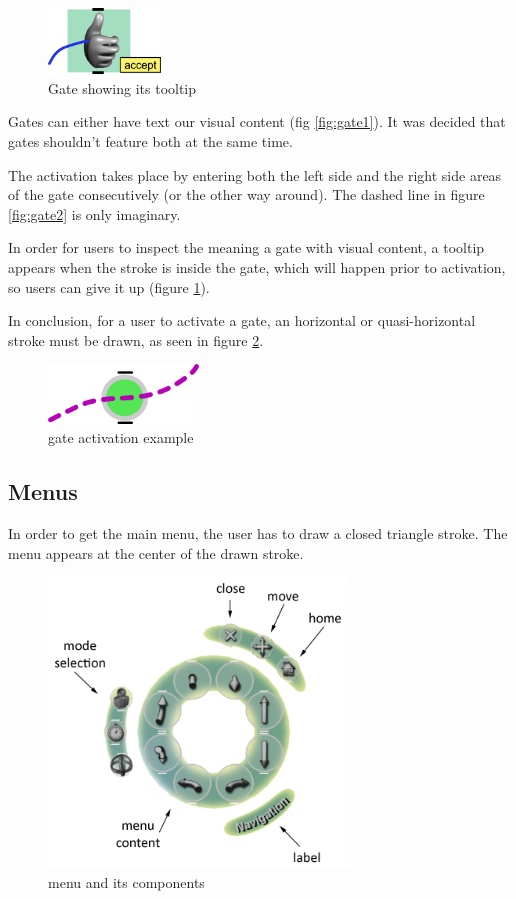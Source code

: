 \begin{figure}[!ht]
		\vspace{-0.3cm}
		\centering
		\includegraphics[width=3cm]{gfx/gate3e.png}
		\vspace{-0.5cm}
		\caption{Gate showing its tooltip}
		\label{fig:gate3}
\end{figure}


Gates can either have text our visual content (fig \ref{fig:gate1}).
It was decided that gates shouldn't feature both at the same time.

The activation takes place by entering both the left side and the right
side areas of the gate consecutively (or the other way around).
The dashed line in figure \ref{fig:gate2} is only imaginary.

In order for users to inspect the meaning a gate with visual content, a
tooltip appears when the stroke is inside the gate,
which will happen prior to activation, so users can give it up (figure \ref{fig:gate3}).

In conclusion, for a user to activate a gate, an horizontal or quasi-horizontal
stroke must be drawn, as seen in figure \ref{fig:gate4}.

\begin{figure}[!ht]
		\centering
		\includegraphics[width=4cm]{gfx/activation.png}
		\caption{gate activation example}
		\label{fig:gate4}
\end{figure}

\subsection{Menus}

In order to get the main menu, the user has to draw a closed triangle stroke.
The menu appears at the center of the drawn stroke.

\begin{figure}[!ht]
		\centering
		\includegraphics[width=8cm]{gfx/menu.png}
		\caption{menu and its components}
		\label{fig:menu}
\end{figure}


